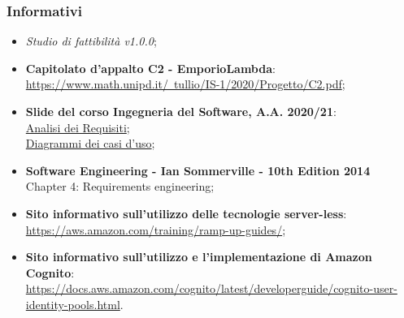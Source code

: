     \subsubsection{Informativi}
    \begin{itemize}
        \item \textit{Studio di fattibilità v1.0.0};
        \item \textbf{Capitolato d'appalto C2 - EmporioLambda}:\\ \href{https://www.math.unipd.it/~tullio/IS-1/2020/Progetto/C2.pdf}{https://www.math.unipd.it/~tullio/IS-1/2020/Progetto/C2.pdf};
        \item \textbf{Slide del corso Ingegneria del Software, A.A. 2020/21}: \\ \href{https://www.math.unipd.it/~tullio/IS-1/2020/Dispense/L07.pdf}{Analisi dei Requisiti}; \\ \href{https://www.math.unipd.it/~rcardin/swea/2021/Diagrammi%20Use%20Case_4x4.pdf}{Diagrammi dei casi d'uso};
        \item \textbf{Software Engineering - Ian Sommerville - 10th Edition 2014}\\
        Chapter 4: Requirements engineering;
        \item \textbf{Sito informativo sull'utilizzo delle tecnologie server-less}:\\ \href{https://aws.amazon.com/training/ramp-up-guides/}{https://aws.amazon.com/training/ramp-up-guides/};
        \item \textbf{Sito informativo sull'utilizzo e l'implementazione di Amazon Cognito}:\\ \href{https://docs.aws.amazon.com/cognito/latest/developerguide/cognito-user-identity-pools.html}{https://docs.aws.amazon.com/cognito/latest/developerguide/cognito-user-identity-pools.html}.
    \end{itemize}